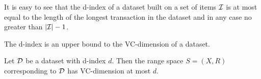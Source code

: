 It is easy to see that the d-index of a dataset built on a set of items ${\cal I}$
is at most equal to the length of the longest transaction in the dataset and in
any case no greater than $|{\cal I}|-1$.


The d-index is an upper bound to the VC-dimension of a dataset.

\begin{theorem}\label{lem:vcdimupperb}
  Let ${\cal D}$ be a dataset with d-index $d$. Then the range space $S=(X,R)$
  corresponding to ${\cal D}$ has VC-dimension at most $d$.
\end{theorem}

